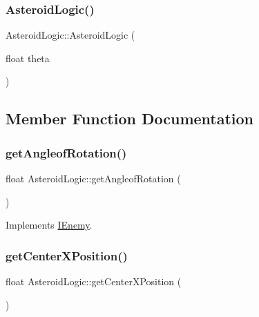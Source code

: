 \subsubsection{\texorpdfstring{Asteroid\+Logic()}{AsteroidLogic()}}
{\footnotesize\ttfamily Asteroid\+Logic\+::\+Asteroid\+Logic (\begin{DoxyParamCaption}\item[{float}]{theta }\end{DoxyParamCaption})}



\subsection{Member Function Documentation}
\mbox{\label{class_asteroid_logic_a2087d2a3b9bf9e6f1367833454b2fb97}} 
\subsubsection{\texorpdfstring{get\+Angleof\+Rotation()}{getAngleofRotation()}}
{\footnotesize\ttfamily float Asteroid\+Logic\+::get\+Angleof\+Rotation (\begin{DoxyParamCaption}{ }\end{DoxyParamCaption})\hspace{0.3cm}{\ttfamily [virtual]}}



Implements \hyperlink{class_i_enemy_a8a9780d5db69d910f264fd7ab89ebee6}{I\+Enemy}.

\mbox{\label{class_asteroid_logic_a4bff0373a2cefe48c984b469ddbcb52d}} 
\subsubsection{\texorpdfstring{get\+Center\+X\+Position()}{getCenterXPosition()}}
{\footnotesize\ttfamily float Asteroid\+Logic\+::get\+Center\+X\+Position (\begin{DoxyParamCaption}{ }\end{DoxyParamCaption})\hspace{0.3cm}{\ttfamily [virtual]}}



